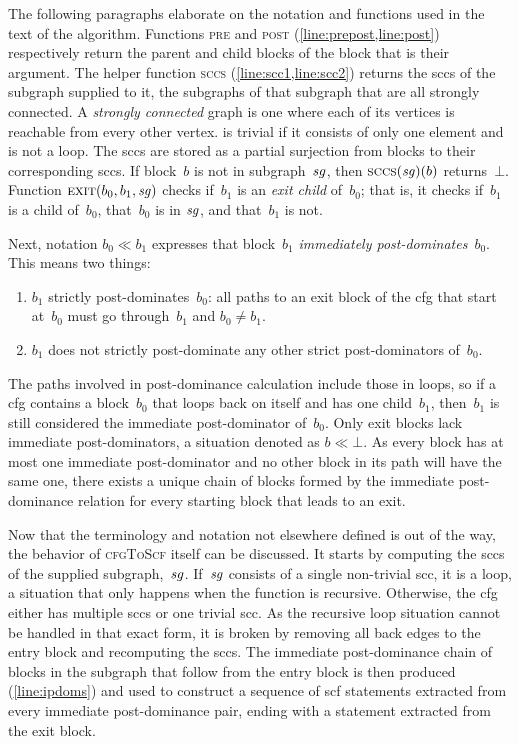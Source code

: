 The following paragraphs elaborate on the notation and functions
used in the text of the algorithm.
Functions \textsc{pre} and \textsc{post} (\cref{line:prepost,line:post})
respectively return the parent and child blocks of the block that is their argument.
The helper function \textsc{sccs} (\cref{line:scc1,line:scc2})
returns the \acp{scc} of the subgraph supplied to it,
the subgraphs of that subgraph that are all strongly connected.
A \emph{strongly connected} graph is one%
where each of its vertices is reachable from every other vertex.
 is trivial if it consists of only one element and is not a loop.
The \acp{scc} are stored as a partial surjection%
from blocks to their corresponding \acp{scc}.
If block~$b$ is not in subgraph~$\mathit{sg}$,
then $\textsc{sccs}(\mathit{sg})(b)$ returns~$\bot$.
Function $\textsc{exit}(b_0,b_1,\mathit{sg})$ checks if~$b_1$ is an \emph{exit child}%
of~$b_0$; that is, it checks if~$b_1$ is a child of~$b_0$,
that~$b_0$ is in $\mathit{sg}$, and that~$b_1$ is not.

Next, notation $b_0\ll b_1$ expresses that block~$b_1$
\emph{immediately post-dominates}~$b_0$.%
This means two things:
\begin{enumerate}
  \item $b_1$ strictly post-dominates~$b_0$:
  all paths to an exit block of the \ac{cfg} that start at~$b_0$
  must go through~$b_1$ and $b_0\neq b_1$.
  \item $b_1$ does not strictly post-dominate
  any other strict post-dominators of~$b_0$.
\end{enumerate}
The paths involved in post-dominance calculation include those in loops,
so if a \ac{cfg} contains a block~$b_0$
that loops back on itself and has one child~$b_1$,
then~$b_1$ is still considered the immediate post-dominator of~$b_0$.%
Only exit blocks lack immediate post-dominators, a situation denoted as $b\ll\bot$.
As every block has at most one immediate post-dominator
and no other block in its path will have the same one,
there exists a unique chain of blocks formed by the immediate post-dominance relation
for every starting block that leads to an exit.

Now that the terminology and notation not elsewhere defined is out of the way,
the behavior of \textsc{cfgToScf} itself can be discussed.
It starts by computing the \acp{scc} of the supplied subgraph,~$\mathit{sg}$.
If~$\mathit{sg}$ consists of a single non-trivial \ac{scc}, it is a loop,%
a situation that only happens when the function is recursive.%
Otherwise, the \ac{cfg} either has multiple \acp{scc} or one trivial \ac{scc}.
As the recursive loop situation cannot be handled in that exact form,
it is broken by removing all back edges to the entry block
and recomputing the \acp{scc}.
The immediate post-dominance chain of blocks in the subgraph
that follow from the entry block is then produced (\cref{line:ipdoms})
and used to construct a sequence of \acl{scf} statements
extracted from every immediate post-dominance pair,
ending with a statement extracted from the exit block.

